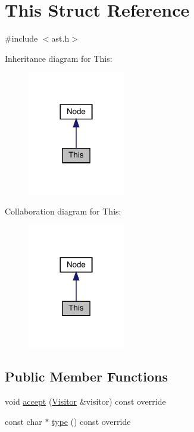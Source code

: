 \hypertarget{struct_this}{}\section{This Struct Reference}
\label{struct_this}


{\ttfamily \#include $<$ast.\+h$>$}



Inheritance diagram for This\+:\nopagebreak
\begin{figure}[H]
\begin{center}
\leavevmode
\includegraphics[width=120pt]{struct_this__inherit__graph}
\end{center}
\end{figure}


Collaboration diagram for This\+:\nopagebreak
\begin{figure}[H]
\begin{center}
\leavevmode
\includegraphics[width=120pt]{struct_this__coll__graph}
\end{center}
\end{figure}
\subsection*{Public Member Functions}
\begin{DoxyCompactItemize}
\item 
void \hyperlink{struct_this_a9ff113a898e7756ce6854c8167dddb15}{accept} (\hyperlink{struct_visitor}{Visitor} \&visitor) const override
\item 
const char $\ast$ \hyperlink{struct_this_a124796ed69ea21377e84a4538c304b3a}{type} () const override
\end{DoxyCompactItemize}



